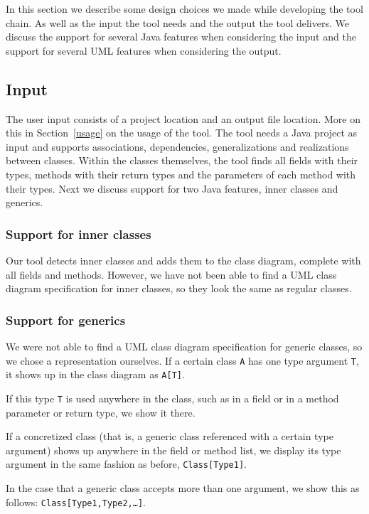 In this section we describe some design choices we made while developing the tool chain. 
As well as the input the tool needs and the output the tool delivers. 
We discuss the support for several Java features when considering the input and the support for several UML features when considering the output.

\subsection{Input}
	The user input consists of a project location and an output file location. 
	More on this in Section~\ref{usage} on the usage of the tool.
	The tool needs a Java project as input and supports associations, dependencies, generalizations and realizations between classes. 
	Within the classes themselves, the tool finds all fields with their types, methods with their return types and the parameters of each method with their types.
	Next we discuss support for two Java features, inner classes and generics.

	\subsubsection{Support for inner classes}
		Our tool detects inner classes and adds them to the class diagram, complete with all fields and methods. 
		However, we have not been able to find a UML class diagram specification for inner classes, so they look the same as regular classes.
		
	\subsubsection{Support for generics}
		We were not able to find a UML class diagram specification for generic classes, so we chose a representation ourselves.
		If a certain class \texttt{A} has one type argument \texttt{T}, it shows up in the class diagram as \texttt{A[T]}.
		
		If this type \texttt{T} is used anywhere in the class, such as in a field or in a method parameter or return type, we show it there.
		
		If a concretized class (that is, a generic class referenced with a certain type argument) shows up anywhere in the field or method list, we display its type argument in the same fashion as before, \texttt{Class[Type1]}.
		
		In the case that a generic class accepts more than one argument, we show this as follows: \texttt{Class[Type1,Type2,\ldots]}.

